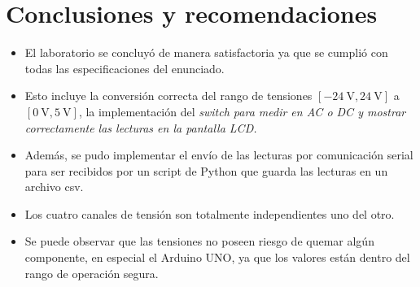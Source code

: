 \section{Conclusiones y recomendaciones}
\begin{itemize}
    \item El laboratorio se concluyó de manera satisfactoria ya que se cumplió con todas las especificaciones del enunciado.
    \item Esto incluye la conversión correcta del rango de tensiones $[\SI{-24}{\volt}, \SI{24}{\volt}]$ a $[\SI{0}{\volt}, \SI{5}{\volt}]$, la implementación del \it{switch} para medir en AC o DC y mostrar correctamente las lecturas en la pantalla LCD.
    \item Además, se pudo implementar el envío de las lecturas por comunicación serial para ser recibidos por un script de Python que guarda las lecturas en un archivo csv.
    \item Los cuatro canales de tensión son totalmente independientes uno del otro.
    \item Se puede observar que las tensiones no poseen riesgo de quemar algún componente, en especial el Arduino UNO, ya que los valores están dentro del rango de operación segura.
\end{itemize}



 





